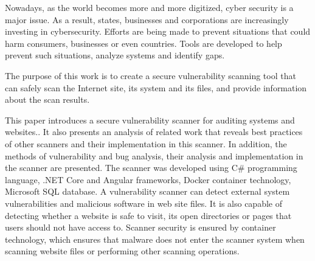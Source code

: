 Nowadays, as the world becomes more and more digitized, cyber security is a major issue. As a result, states, businesses and corporations are increasingly investing in cybersecurity. Ef{}forts are being made to prevent situations that could harm consumers, businesses or even countries. Tools are developed to help prevent such situations, analyze systems and identify gaps.

The purpose of this work is to create a secure vulnerability scanning tool that can safely scan the Internet
site, its system and its files, and provide information about the scan results.

This paper introduces a secure vulnerability scanner for auditing systems and websites..
It also presents an analysis of related work that reveals best practices of other scanners and their implementation in this scanner.
In addition, the methods of vulnerability and bug analysis, their analysis and implementation in the scanner are presented.
The scanner was developed using C\# programming language, .NET Core and Angular frameworks, Docker container technology, Microsoft SQL database.
A vulnerability scanner can detect external system vulnerabilities and malicious software in web site files.
It is also capable of detecting whether a website is safe to visit, its open directories or pages that users should not have access to.
Scanner security is ensured by container technology, which ensures that malware does not enter the scanner system when scanning website files or performing other scanning operations.